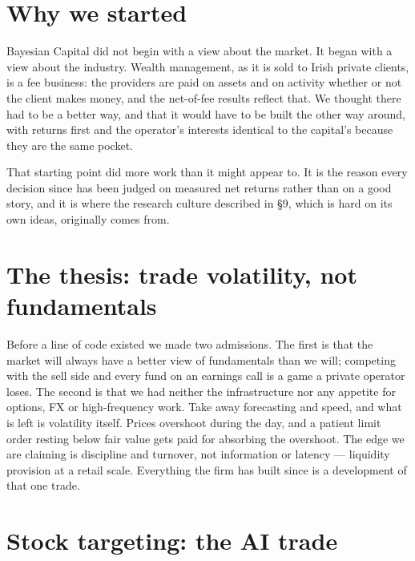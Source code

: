 \documentclass[11pt,a4paper]{article}
\begin{document}
\begin{center}
\end{center}

\section{Why we started}

Bayesian Capital did not begin with a view about the market. It began with a
view about the industry. Wealth management, as it is sold to Irish private
clients, is a fee business: the providers are paid on assets and on activity
whether or not the client makes money, and the net-of-fee results reflect
that. We thought there had to be a better way, and that it would have to be
built the other way around, with returns first and the operator's interests
identical to the capital's because they are the same pocket.

That starting point did more work than it might appear to. It is the reason
every decision since has been judged on measured net returns rather than on a
good story, and it is where the research culture described in \S9, which is
hard on its own ideas, originally comes from.

\section{The thesis: trade volatility, not fundamentals}

Before a line of code existed we made two admissions. The first is that the
market will always have a better view of fundamentals than we will; competing
with the sell side and every fund on an earnings call is a game a private
operator loses. The second is that we had neither the infrastructure nor any
appetite for options, FX or high-frequency work. Take away forecasting and
speed, and what is left is volatility itself. Prices overshoot during the
day, and a patient limit order resting below fair value gets paid for
absorbing the overshoot. The edge we are claiming is discipline and turnover,
not information or latency --- liquidity provision at a retail scale.
Everything the firm has built since is a development of that one trade.

\section{Stock targeting: the AI trade}
\end{document}
